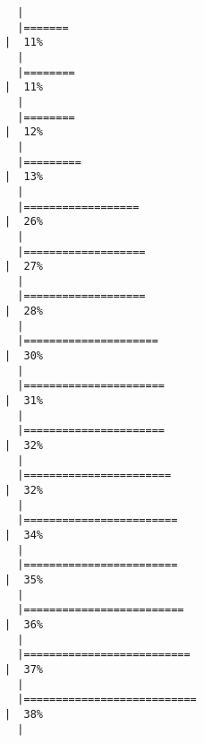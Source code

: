 \documentclass[
  letterpaper,
]{book}
\begin{document}
\begin{verbatim}
  |                                                                            
  |=======                                                               |  11%
  |                                                                            
  |========                                                              |  11%
  |                                                                            
  |========                                                              |  12%
  |                                                                            
  |=========                                                             |  13%
  |                                                                            
  |==================                                                    |  26%
  |                                                                            
  |===================                                                   |  27%
  |                                                                            
  |===================                                                   |  28%
  |                                                                            
  |=====================                                                 |  30%
  |                                                                            
  |======================                                                |  31%
  |                                                                            
  |======================                                                |  32%
  |                                                                            
  |=======================                                               |  32%
  |                                                                            
  |========================                                              |  34%
  |                                                                            
  |========================                                              |  35%
  |                                                                            
  |=========================                                             |  36%
  |                                                                            
  |==========================                                            |  37%
  |                                                                            
  |===========================                                           |  38%
  |                                                                            

\end{verbatim}
\end{document}
